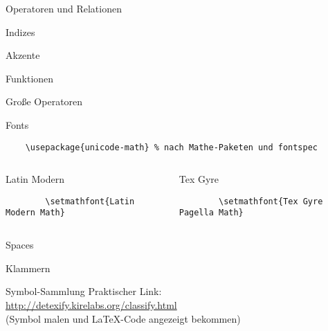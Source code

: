 \begin{frame}{Operatoren und Relationen}
\end{frame}

\begin{frame}{Indizes}
\end{frame}

\begin{frame}{Akzente}
\end{frame}

\begin{frame}{Funktionen}
\end{frame}

\begin{frame}{Große Operatoren}
\end{frame}

\begin{frame}[fragile]{Fonts}
  \begin{Packages}
    \begin{lstlisting}
    \usepackage{unicode-math} % nach Mathe-Paketen und fontspec
    \end{lstlisting}
  \end{Packages}
  \begin{columns}[onlytextwidth, t]
    \begin{column}{0.48\textwidth}
      \begin{block}{Latin Modern}
        \begin{lstlisting}
        \setmathfont{Latin Modern Math}
        \end{lstlisting}
      \end{block}
    \end{column}
    \begin{column}{0.48\textwidth}
      \begin{block}{Tex Gyre}
        \begin{lstlisting}
        \setmathfont{Tex Gyre Pagella Math}
        \end{lstlisting}
      \end{block}
    \end{column}
  \end{columns}
\end{frame}

\begin{frame}{Spaces}
\end{frame}

\begin{frame}{Klammern}
\end{frame}

\begin{frame}[fragile]{
  Symbol-Sammlung
  \hfill{}
}
  Praktischer Link: \\
  \url{http://detexify.kirelabs.org/classify.html} \\
  (Symbol malen und \LaTeX-Code angezeigt bekommen)
\end{frame}

